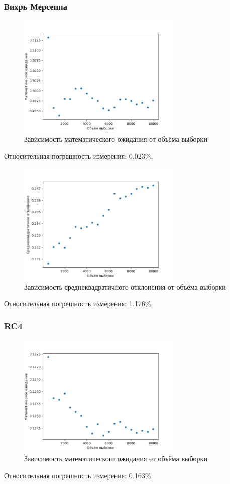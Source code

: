 \documentclass[bachelor, och, labwork]{SCWorks}
\begin{document}
\subsubsection{Вихрь Мерсенна}
\begin{figure}[H]
  \centering
  \includegraphics[width=0.7\textwidth]{mt_me.png}
  \caption{Зависимость математического ожидания от объёма выборки}
\end{figure}
Относительная погрешность измерения: 0.023\%.

\begin{figure}[H]
  \centering
  \includegraphics[width=0.7\textwidth]{mt_st.png}
  \caption{Зависимость среднеквадратичного отклонения от объёма выборки}
\end{figure}
Относительная погрешность измерения: 1.176\%.

\subsubsection{RC4}
\begin{figure}[H]
  \centering
  \includegraphics[width=0.7\textwidth]{rc_me.png}
  \caption{Зависимость математического ожидания от объёма выборки}
\end{figure}
Относительная погрешность измерения: 0.163\%.
\end{document}
